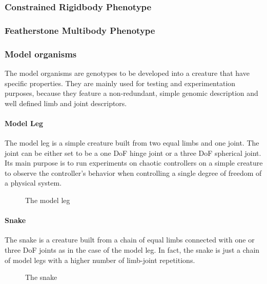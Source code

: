 \documentclass[main]{subfiles}
\begin{document}
\subsubsection{Constrained Rigidbody Phenotype}

\lipsum[10]

\subsubsection{Featherstone Multibody Phenotype}

\lipsum[11]

\subsubsection{Model organisms}

The model organisms are genotypes to be developed into a creature that have specific properties. They are mainly used for testing and experimentation purposes, because they feature a non-redundant, simple genomic description and well defined limb and joint descriptors.

\paragraph{Model Leg}

The model leg is a simple creature built from two equal limbs and one joint. The joint can be either set to be a one DoF hinge joint or a three DoF spherical joint. Its main purpose is to run experiments on chaotic controllers on a simple creature to observe the controller's behavior when controlling a single degree of freedom of a physical system.

\begin{figure}[!h]
\centering
{}
\caption{The model leg}
\label{figure:model-leg}
\end{figure}

\paragraph{Snake}

The snake is a creature built from a chain of equal limbs connected with one or three DoF joints as in the case of the model leg. In fact, the snake is just a chain of model legs with a higher number of limb-joint repetitions.

\begin{figure}[!h]
\centering
{}
\caption{The snake}
\label{figure:snake}
\end{figure}
\end{document}
